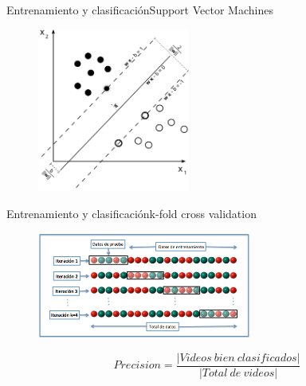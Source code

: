 \documentclass{beamer}
\begin{document}
        
        \begin{frame}{Entrenamiento y clasificación}{Support Vector Machines}
            \begin{figure}[bt]
        		\centering
                \includegraphics[width=5cm]{imagenes/support_vector_machines.png}
            \end{figure}
        \end{frame}
        
        \begin{frame}{Entrenamiento y clasificación}{k-fold cross validation}
            \begin{figure}[bt]
        		\centering
                \includegraphics[width=7cm]{imagenes/K-fold.jpg}
            \end{figure}
            \begin{equation}
            		Precision = \frac{|Videos~bien~clasificados|}{|Total~de~videos|} 
            \end{equation}
   
        \end{frame}
        
        
\end{document}
